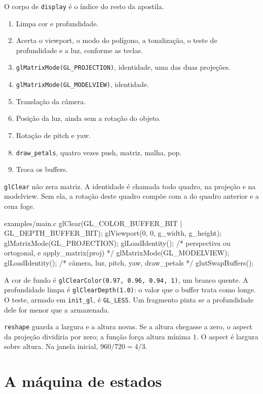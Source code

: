 \documentclass[11pt,a4paper]{article}
\newcommand{\fn}[1]{\texttt{\nobreak\hspace{0pt}#1}}
\begin{document}
O corpo de \fn{display} é o índice do resto da apostila.

\begin{enumerate}
\item Limpa cor e profundidade.
\item Acerta o viewport, o modo do polígono, a tonalização, o teste de profundidade e a luz, conforme as teclas.
\item \fn{glMatrixMode(GL\_PROJECTION)}, identidade, uma das duas projeções.
\item \fn{glMatrixMode(GL\_MODELVIEW)}, identidade.
\item Translação da câmera.
\item Posição da luz, ainda sem a rotação do objeto.
\item Rotação de pitch e yaw.
\item \fn{draw\_petals}, quatro vezes push, matriz, malha, pop.
\item Troca os buffers.
\end{enumerate}

\fn{glClear} não zera matriz. A identidade é chamada todo quadro, na projeção e na modelview. Sem ela, a rotação deste quadro compõe com a do quadro anterior e a cena foge.

\begin{codigo}{examples/main.c}
glClear(GL_COLOR_BUFFER_BIT | GL_DEPTH_BUFFER_BIT);
glViewport(0, 0, g_width, g_height);
glMatrixMode(GL_PROJECTION);
glLoadIdentity();
/* perspectiva ou ortogonal, e apply_matrix(proj) */
glMatrixMode(GL_MODELVIEW);
glLoadIdentity();
/* câmera, luz, pitch, yaw, draw_petals */
glutSwapBuffers();
\end{codigo}

A cor de fundo é \fn{glClearColor(0.97, 0.96, 0.94, 1)}, um branco quente. A profundidade limpa é \fn{glClearDepth(1.0)}: o valor que o buffer trata como longe. O teste, armado em \fn{init\_gl}, é \fn{GL\_LESS}. Um fragmento pinta se a profundidade dele for menor que a armazenada.

\fn{reshape} guarda a largura e a altura novas. Se a altura chegasse a zero, o aspect da projeção dividiria por zero; a função força altura mínima \(1\). O aspect é largura sobre altura. Na janela inicial, \(960/720 = 4/3\).

\section{A máquina de estados}
\label{sec:estado}
\end{document}
